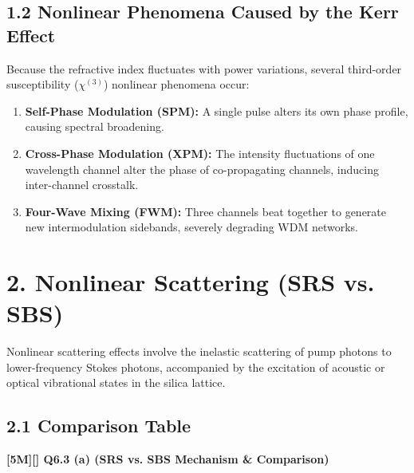 \subsection{1.2 Nonlinear Phenomena Caused by the Kerr Effect}
Because the refractive index fluctuates with power variations, several third-order susceptibility ($\chi^{(3)}$) nonlinear phenomena occur:
\begin{enumerate}
  \item \textbf{Self-Phase Modulation (SPM):} A single pulse alters its own phase profile, causing spectral broadening.
  \item \textbf{Cross-Phase Modulation (XPM):} The intensity fluctuations of one wavelength channel alter the phase of co-propagating channels, inducing inter-channel crosstalk.
  \item \textbf{Four-Wave Mixing (FWM):} Three channels beat together to generate new intermodulation sidebands, severely degrading WDM networks.
\end{enumerate}


\section{2. Nonlinear Scattering (SRS vs. SBS)}

Nonlinear scattering effects involve the inelastic scattering of pump photons to lower-frequency Stokes photons, accompanied by the excitation of acoustic or optical vibrational states in the silica lattice.

\subsection{2.1 Comparison Table}
\textbf{[5M][] Q6.3 (a) (SRS vs. SBS Mechanism \& Comparison)}

